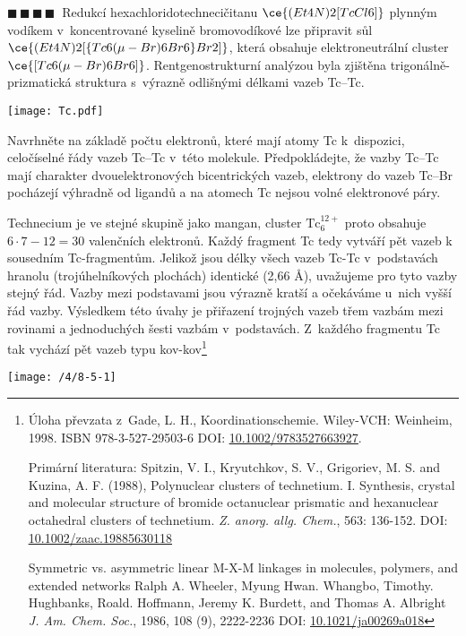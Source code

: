 \documentclass{book}
\newcommand{\ctyri}{$\blacksquare \, \blacksquare \, \blacksquare \, \blacksquare \; \; $}
\renewenvironment{quotation}{\par}{\par} %
\begin{document}
\hrulefill %
\begin{quotation}
\ctyri Redukcí hexachloridotechnecičitanu $\ce{(Et4N)2[TcCl6]}$ plynným
vodíkem v~koncentrované kyselině bromovodíkové lze připravit sůl
$\ce{(Et4N)2[\{Tc6(\mu-Br)6Br6\}Br2]}$, která obsahuje elektroneutrální
cluster $\ce{[Tc6(\mu-Br)6Br6]}$. Rentgenostrukturní analýzou byla
zjištěna trigo\-nálně-prizmatická struktura s~výrazně odlišnými délkami
vazeb Tc--Tc. 
\begin{center}

\texttt{[image: Tc.pdf]}

\par\end{center}
Navrhněte na základě počtu elektronů, které mají atomy Tc k~dispozici,
celočíselné řády vazeb Tc--Tc v~této molekule. Předpokládejte, že
vazby Tc--Tc mají charakter dvouelektronových bicentrických vazeb,
elektrony do vazeb Tc--Br pocházejí výhradně od ligandů a na atomech
Tc nejsou volné elektronové páry.
\end{quotation} \dotfill \par 
\newpage %
Technecium je ve stejné skupině jako mangan, cluster $\mathrm{Tc}_{6}^{12+}$
proto obsahuje $6\cdot7-12=30$ valenčních elektronů. Každý fragment Tc tedy vytváří pět vazeb
k sousedním Tc-fragmentům. Jelikož jsou délky všech vazeb Tc-Tc v~podstavách hranolu (trojúhelníkových plochách) identické (2,66 Å),
uvažujeme pro tyto vazby stejný řád. Vazby mezi podstavami jsou výrazně
kratší a očekáváme u~nich vyšší řád vazby. Výsledkem této úvahy je
přiřazení trojných vazeb třem vazbám mezi rovinami a jednoduchých
šesti vazbám v~podstavách. Z~každého fragmentu Tc tak vychází pět
vazeb typu kov-kov\footnote{Úloha převzata z~Gade, L. H., Koordinationschemie. Wiley-VCH: Weinheim,
1998. ISBN 978-3-527-29503-6 DOI: \href{https://onlinelibrary.wiley.com/doi/book/10.1002/9783527663927}{\underline{10.1002/9783527663927}}.

Primární literatura: Spitzin, V. I., Kryutchkov, S. V., Grigoriev,
M. S. and Kuzina, A. F. (1988), Polynuclear clusters of technetium.
I. Synthesis, crystal and molecular structure of bromide octanuclear
prismatic and hexanuclear octahedral clusters of technetium. \textit{Z. anorg.
allg. Chem.}, 563: 136-152. DOI: \href{https://doi.org/10.1002/zaac.19885630118}{\underline{10.1002/zaac.19885630118}}

Symmetric vs. asymmetric linear M-X-M linkages in molecules, polymers,
and extended networks Ralph A. Wheeler, Myung Hwan. Whangbo, Timothy.
Hughbanks, Roald. Hoffmann, Jeremy K. Burdett, and Thomas A. Albright
\textit{J. Am. Chem. Soc.}, 1986, 108 (9), 2222-2236 DOI: \href{https://doi.org/10.1021/ja00269a018}{\underline{10.1021/ja00269a018}}
}
\noindent \begin{center}

\texttt{[image: /4/8-5-1]}

\par\end{center}
\end{document}
